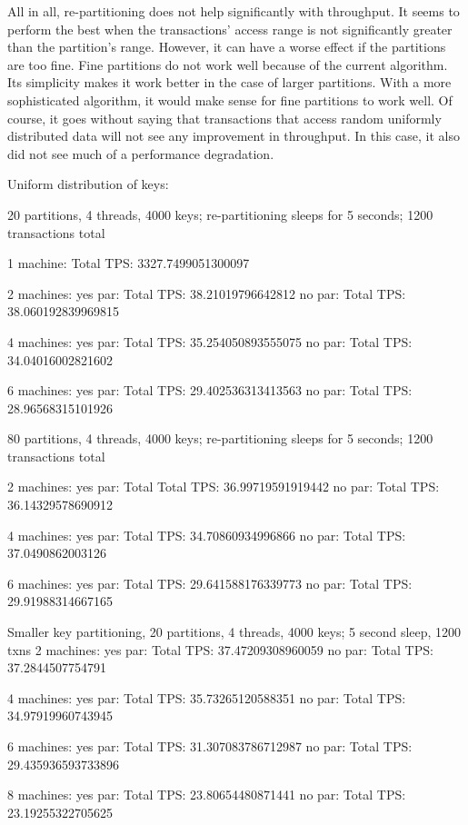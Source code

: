 \documentclass[a4paper, 10pt, notitlepage]{report}
\begin{document}
All in all, re-partitioning does not help significantly with throughput. It seems to perform the best when 
the transactions' access range is not significantly greater than the partition's range. However, it can have
a worse effect if the partitions are too fine. Fine partitions do not work well because of the current algorithm.
Its simplicity makes it work better in the case of larger partitions. With a more sophisticated algorithm,
it would make sense for fine partitions to work well. Of course, it goes without saying that transactions that
access random uniformly distributed data will not see any improvement in throughput. In this case, it also
did not see much of a performance degradation.


\iffalse
Uniform distribution of keys:

20 partitions, 4 threads, 4000 keys; re-partitioning sleeps for 5 seconds; 1200 transactions total

1 machine:
Total TPS: 3327.7499051300097

2 machines:
yes par: Total TPS: 38.21019796642812
no par: Total TPS: 38.060192839969815

4 machines:
yes par: Total TPS: 35.254050893555075
no par: Total TPS: 34.04016002821602

6 machines:
yes par: Total TPS: 29.402536313413563
no par: Total TPS: 28.96568315101926


80 partitions, 4 threads, 4000 keys; re-partitioning sleeps for 5 seconds; 1200 transactions total

2 machines:
yes par: Total Total TPS: 36.99719591919442
no par: Total TPS: 36.14329578690912

4 machines:
yes par: Total TPS: 34.70860934996866
no par: Total TPS: 37.0490862003126

6 machines:
yes par: Total TPS: 29.641588176339773
no par: Total TPS: 29.91988314667165

Smaller key partitioning, 20 partitions, 4 threads, 4000 keys; 5 second sleep, 1200 txns
2 machines:
yes par: Total TPS: 37.47209308960059
no par: Total TPS: 37.2844507754791

4 machines:
yes par: Total TPS: 35.73265120588351
no par: Total TPS: 34.97919960743945

6 machines:
yes par: Total TPS: 31.307083786712987
no par: Total TPS: 29.435936593733896

8 machines:
yes par: Total TPS: 23.80654480871441
no par: Total TPS: 23.19255322705625
\end{document}

